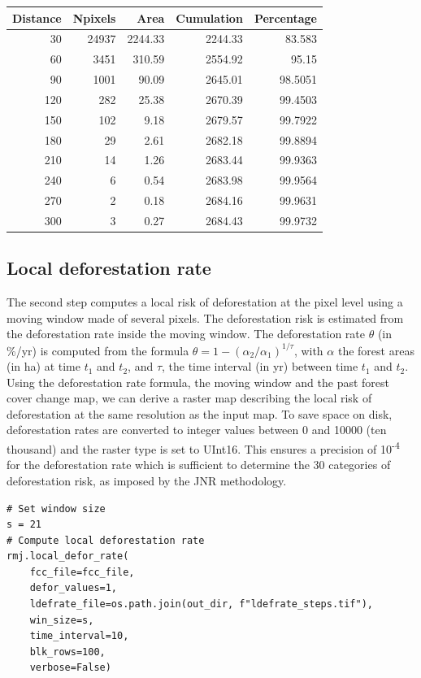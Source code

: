 \documentclass[paper=a4, 12pt, DIV=12]{scrartcl}
\begin{document}
\begin{center}
\begin{tabular}{rrrrr}
Distance & Npixels & Area & Cumulation & Percentage\\
\hline
30 & 24937 & 2244.33 & 2244.33 & 83.583\\
60 & 3451 & 310.59 & 2554.92 & 95.15\\
90 & 1001 & 90.09 & 2645.01 & 98.5051\\
120 & 282 & 25.38 & 2670.39 & 99.4503\\
150 & 102 & 9.18 & 2679.57 & 99.7922\\
180 & 29 & 2.61 & 2682.18 & 99.8894\\
210 & 14 & 1.26 & 2683.44 & 99.9363\\
240 & 6 & 0.54 & 2683.98 & 99.9564\\
270 & 2 & 0.18 & 2684.16 & 99.9631\\
300 & 3 & 0.27 & 2684.43 & 99.9732\\
\end{tabular}
\end{center}

\subsection{Local deforestation rate}
\label{sec:org6fc5a9a}

The second step computes a local risk of deforestation at the pixel level using a moving window made of several pixels. The deforestation risk is estimated from the deforestation rate inside the moving window. The deforestation rate \(\theta\) (in \%/yr) is computed from the formula \(\theta=1-(\alpha_2/\alpha_1)^{1/\tau}\), with \(\alpha\) the forest areas (in ha) at time \(t_1\) and \(t_2\), and \(\tau\), the time interval (in yr) between time \(t_1\) and \(t_2\). Using the deforestation rate formula, the moving window and the past forest cover change map, we can derive a raster map describing the local risk of deforestation at the same resolution as the input map. To save space on disk, deforestation rates are converted to integer values between 0 and 10000 (ten thousand) and the raster type is set to UInt16. This ensures a precision of 10\textsuperscript{-4} for the deforestation rate which is sufficient to determine the 30 categories of deforestation risk, as imposed by the JNR methodology.

\begin{verbatim}
# Set window size
s = 21
# Compute local deforestation rate
rmj.local_defor_rate(
    fcc_file=fcc_file,
    defor_values=1,
    ldefrate_file=os.path.join(out_dir, f"ldefrate_steps.tif"),
    win_size=s,
    time_interval=10,
    blk_rows=100,
    verbose=False)
\end{verbatim}
\end{document}

